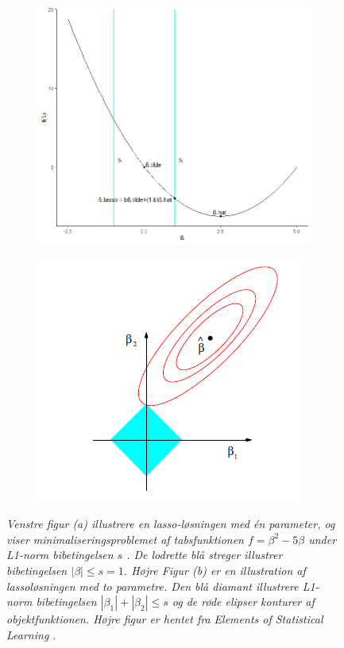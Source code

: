 \documentclass[11pt,a4paper]{article}
\begin{document}
\begin{figure}[h!]
  \centering
    \begin{subfigure}[b]{0.48\linewidth}
    \includegraphics[width=\textwidth]{LAMBDABETA.png}
    \caption{}
  \label{fig:lasso1dim}
  \end{subfigure}
  \begin{subfigure}[b]{0.48\linewidth}
    \includegraphics[width=\textwidth]{Lasso-ESL.PNG}
    \caption{}
    \label{fig:lasso2dim}
  \end{subfigure}
  \caption{\textit{Venstre figur (a) illustrere en lasso-løsningen med én parameter, og viser minimaliseringsproblemet af tabsfunktionen $f=\beta^2-5\beta$ under L1-norm bibetingelsen $s$ . De lodrette blå streger illustrer bibetingelsen $|\beta|\leq s=1$. Højre Figur (b) er en illustration af lassoløsningen med to parametre. Den blå diamant illustrere L1-norm bibetingelsen $|\beta_1| + |\beta_2| \leq  s$ og de røde elipser konturer af objektfunktionen. Højre figur er hentet fra Elements of Statistical Learning \cite{ESL}}.}
\label{fig:lassofigure}\end{figure}
\end{document}
